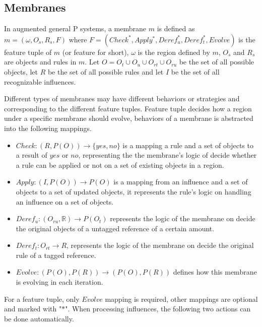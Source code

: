 \documentclass[9pt,a4paper,twoside]{article}
\begin{document}
\subsection{Membranes}

        In augmented general P systems, a membrane $m$ is defined as $m=(\omega, O_s, R_s, F)$ where $F = (Check^*, Apply^*, Deref_u^*, Deref_t^*, Evolve)$ is the feature tuple of $m$ (or feature for short), $\omega$ is the region defined by $m$, $O_s$ and $R_s$ are objects and rules in $m$.
        Let $O = O_t \cup O_u \cup O_{rt} \cup O_{ru}$ be the set of all possible objects, let $R$ be the set of all possible rules and let $I$ be the set
        of all recognizable influences.
        
        Different types of membranes may have different behaviors or strategies and corresponding to the different feature tuples. Feature tuple decides how a region under a specific membrane should evolve, 
        behaviors of a membrane is abstracted into the following mappings.


    \begin{itemize}
        \item  $Check: (R, P(O)) \rightarrow \{yes, no\}$ is a mapping a rule and a set of objects to a result of $yes$ or $no$, representing the
        the membrane's logic of decide whether a rule can be applied or not on a set of existing objects in a region.
        
        \item  $Apply: (I, P(O)) \rightarrow P(O)$ is a mapping from an influence and a set of objects to a set of updated objects,
        it represents the rule's logic on handling an influence on a set of objects.

        \item $Deref_u: (O_{ru}, \mathbb{R}) \rightarrow P(O_t)$ represents the logic of the membrane on decide the original objects of a untagged reference
        of a certain amount. 
        
        \item $Deref_t: O_{rt} \rightarrow R$, represents the logic of the membrane on decide the original rule of a tagged reference.

        \item $Evolve: (P(O), P(R)) \rightarrow (P(O), P(R))$ defines how this membrane is evolving in each iteration.

    \end{itemize}

        For a feature tuple, only $Evolve$ mapping is required, other mappings are optional and marked with "$*$".
        When processing influences, the following two actions can be done automatically.
        
\end{document}

